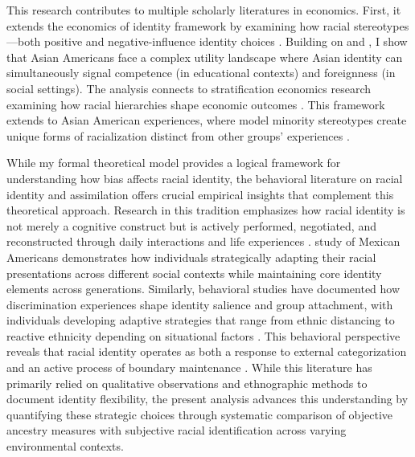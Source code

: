 This research contributes to multiple scholarly literatures in economics. First, it extends the economics of identity framework by examining how racial stereotypes—both positive and negative-influence identity choices \autocite{akerlofEconomicsIdentity2000}. Building on \textcite{charnessSocialIdentityGroup2020} and \textcite{atkinHowWeChoose2021}, I show that Asian Americans face a complex utility landscape where Asian identity can simultaneously signal competence (in educational contexts) and foreignness (in social settings). The analysis connects to stratification economics research examining how racial hierarchies shape economic outcomes \autocite{darityEconomicsIdentityOrigin2006,darityPositionPossessionsStratification2022}. This framework extends to Asian American experiences, where model minority stereotypes create unique forms of racialization distinct from other groups' experiences \autocite{goldsmithDarkLightSkin2007,hamiltonSheddingLightMarriage2009,dietteSkinShadeStratification2015}.

While my formal theoretical model provides a logical framework for understanding how bias affects racial identity, the behavioral literature on racial identity and assimilation offers crucial empirical insights that complement this theoretical approach. Research in this tradition emphasizes how racial identity is not merely a cognitive construct but is actively performed, negotiated, and reconstructed through daily interactions and life experiences \autocite{waters1990ethnic}. \textcite{telles2008generations} study of Mexican Americans demonstrates how individuals strategically adapting their racial presentations across different social contexts while maintaining core identity elements across generations. Similarly, behavioral studies have documented how discrimination experiences shape identity salience and group attachment, with individuals developing adaptive strategies that range from ethnic distancing to reactive ethnicity depending on situational factors \autocite{zhou1997segmented}. This behavioral perspective reveals that racial identity operates as both a response to external categorization and an active process of boundary maintenance \autocite{cornell2006ethnicity}. While this literature has primarily relied on qualitative observations and ethnographic methods to document identity flexibility, the present analysis advances this understanding by quantifying these strategic choices through systematic comparison of objective ancestry measures with subjective racial identification across varying environmental contexts.

